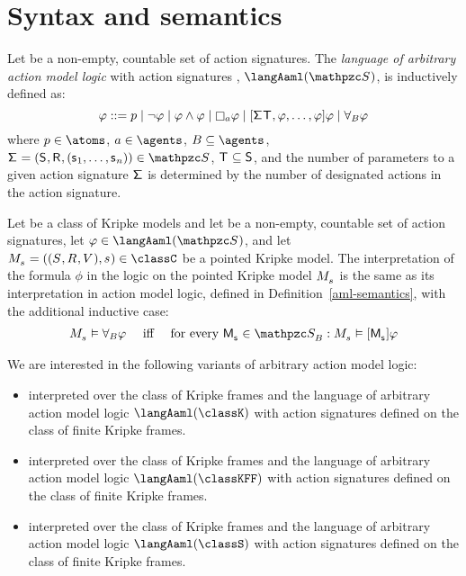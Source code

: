 \section{Syntax and semantics}

\begin{definition}
Let \aSignatureFamily{} be a non-empty, countable set of action signatures.
The {\em language of arbitrary action model logic} with action signatures \aSignatureFamily{}, $\langAaml(\aSignatureFamily)$, is inductively defined as:
$$
\phi ::= 
    \atomP \mid
    \lnot \phi \mid
    \phi \land \phi \mid
    \necessaryA \phi \mid
    \actionA{\aSignature \aStatesT, \phi, \dots, \phi} \phi \mid
    \allactsBs \phi
$$
where $\atomP \in \atoms$, $\agentA \in \agents$, $\agentsB \subseteq \agents$, $\aSignatureAndTuple \in \aSignatureFamily$, $\aStatesT \subseteq \aStates$, and the number of parameters to a given action signature $\aSignature$ is determined by the number of designated actions in the action signature.
\end{definition}

\begin{definition}\label{aaml-semantics}
Let \classC{} be a class of Kripke models and let \aSignatureFamily{} be a non-empty, countable set of action signatures, let $\phi \in \langAaml(\aSignatureFamily)$, and let $\kPModelAndTuple{\kStateS} \in \classC$ be a pointed Kripke model.
The interpretation of the formula $\phi$ in the logic \logicAamlC{} on the pointed Kripke model $\kPModel{\kStateS}$ is the same as its interpretation in action model logic, defined in Definition~\ref{aml-semantics}, with the additional inductive case:
$$
\begin{array}{lcl}
    \kPModel{\kStateS} \entails \allactsBs \phi & \text{ iff } & \text{for every } \aPModel{\aStateS} \in \aSignatureFamily_\agentsB : \kPModel{\kStateS} \entails \actionA{\aPModel{\aStateS}} \phi
\end{array}
$$
\end{definition}

We are interested in the following variants of arbitrary action model logic:
\begin{itemize}
    \item \logicAamlK{} interpreted over the class of \classK{} Kripke frames and the language of arbitrary action model logic $\langAaml(\classK)$ with action signatures defined on the class of finite \classK{} Kripke frames.
    \item \logicAamlKFF{} interpreted over the class of \classKFF{} Kripke frames and the language of arbitrary action model logic $\langAaml(\classKFF)$ with action signatures defined on the class of finite \classKFF{} Kripke frames.
    \item \logicAamlS{} interpreted over the class of \classS{} Kripke frames and the language of arbitrary action model logic $\langAaml(\classS)$ with action signatures defined on the class of finite \classS{} Kripke frames.
\end{itemize}

